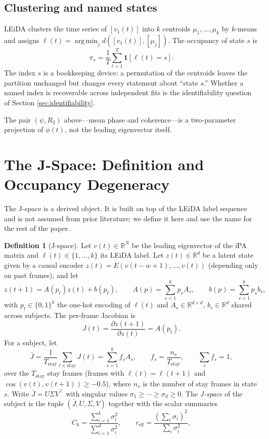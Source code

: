 \documentclass[11pt]{article}
\theoremstyle{definition}
\newtheorem{definition}{Definition}
\newcommand{\R}{\mathbb{R}}
\newcommand{\one}{\mathbf{1}}
\DeclareMathOperator*{\argmin}{arg\,min}
\begin{document}
\subsection{Clustering and named states}
LEiDA clusters the time series of $[v_1(t)]$ into $k$ centroids
$\mu_1,\dots,\mu_k$ by $k$-means and assigns
$\ell(t)=\argmin_j d([v_1(t)],[\mu_j])$. The occupancy of state $s$ is
\begin{equation}
\pi_s=\frac1T\sum_{t=1}^{T}\one[\ell(t)=s].
\end{equation}
The index $s$ is a bookkeeping device: a permutation of the centroids leaves the
partition unchanged but changes every statement about ``state $s$.'' Whether a named
index is recoverable across independent fits is the identifiability question of Section
\ref{sec:identifiability}.

The pair $(\psi,R_2)$ above---mean phase and coherence---is a two-parameter projection
of $\phi(t)$, not the leading eigenvector itself.

\section{The J-Space: Definition and Occupancy Degeneracy}
\label{sec:jspace}

The J-space is a derived object. It is built on top of the LEiDA label sequence and is
not assumed from prior literature; we define it here and use the name for the rest of
the paper.

\begin{definition}[J-space]
Let $v(t)\in\R^N$ be the leading eigenvector of the iPA matrix and
$\ell(t)\in\{1,\dots,k\}$ its LEiDA label. Let $z(t)\in\R^d$ be a latent state given
by a causal encoder $z(t)=E(v(t-w+1),\dots,v(t))$ (depending only on past frames), and let
\begin{equation}
z(t+1)=A(p_t)z(t)+b(p_t),
\qquad
A(p)=\sum_{s=1}^{k}p_sA_s,
\qquad
b(p)=\sum_{s=1}^{k}p_sb_s,
\label{eq:field}
\end{equation}
with $p_t\in\{0,1\}^k$ the one-hot encoding of $\ell(t)$ and
$A_s\in\R^{d\times d}$, $b_s\in\R^d$ shared across subjects. The per-frame Jacobian is
\begin{equation}
J(t)=\frac{\partial z(t+1)}{\partial z(t)}=A(p_t).
\label{eq:Jt}
\end{equation}
For a subject, let
\begin{equation}
\bar J=\frac1{T_{\mathrm{stay}}}\sum_{t\in\mathrm{stay}}J(t)
=\sum_{s=1}^{k}f_sA_s,
\qquad
f_s=\frac{n_s}{T_{\mathrm{stay}}},
\qquad
\sum_s f_s=1,
\label{eq:Jbar}
\end{equation}
over the $T_{\mathrm{stay}}$ stay frames (frames with $\ell(t)=\ell(t+1)$ and
$\cos(v(t),v(t+1))\ge-0.5$), where $n_s$ is the number of stay frames in state $s$.
Write $\bar J=U\Sigma V^{\top}$ with singular values
$\sigma_1\ge\cdots\ge\sigma_d\ge0$. The \emph{J-space} of the subject
is the tuple $(\bar J,U,\Sigma,V)$ together with the scalar summaries
\begin{equation}
C_k=\frac{\sum_{i=1}^{k}\sigma_i^2}{\sum_{i=1}^{d}\sigma_i^2},
\qquad
r_{\mathrm{eff}}=\frac{(\sum_i\sigma_i)^2}{\sum_i\sigma_i^2},
\end{equation}
\end{definition}
\end{document}

